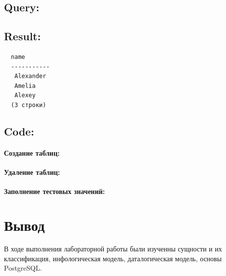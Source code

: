 \documentclass[12pt,onecolumn]{article}
\begin{document}
\subsection{Query:}

\subsection{Result:}
\begin{verbatim}
  name
  -----------
   Alexander
   Amelia
   Alexey
  (3 строки)
\end{verbatim}
\subsection{Code:}
\paragraph*{Создание таблиц:}

\paragraph*{Удаление таблиц:}

\paragraph*{Заполнение тестовых значений:}

\section{Вывод}
В ходе выполнения лабораторной работы были изученны сущности и их классификация,
инфологическая модель, даталогическая модель, основы PostgreSQL.
\end{document}

